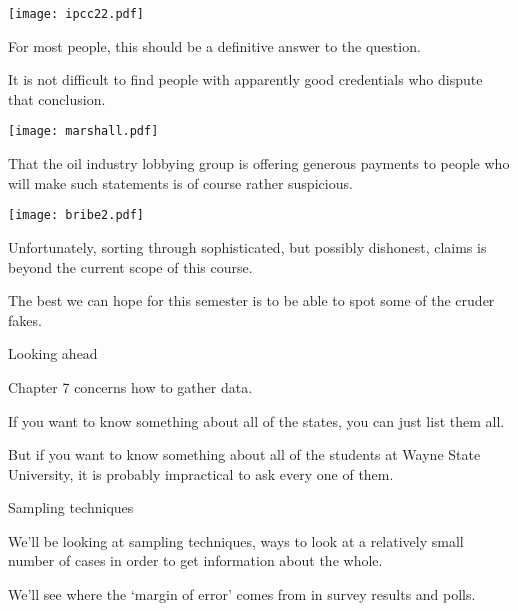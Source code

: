 \documentclass{beamer}
\begin{document}
\begin{frame}
\texttt{[image: ipcc22.pdf]}
\end{frame}

\begin{frame}
For most people, this should be a definitive answer to the
question.

\vfill
It is not difficult to find people with apparently good credentials
who dispute that conclusion.
\end{frame}

\begin{frame}
\texttt{[image: marshall.pdf]}
\end{frame}


\begin{frame}
That the oil industry lobbying group
is offering generous payments to people who will
make such statements is of course rather suspicious.  
\end{frame}

\begin{frame}
\texttt{[image: bribe2.pdf]}
\end{frame}

\begin{frame}
Unfortunately, sorting through sophisticated, but possibly
dishonest, claims is beyond the current scope of this course.

\vfill
The best we can hope for this semester is to be able to spot some
of the cruder fakes.
\end{frame}

\begin{frame}{Looking ahead}

Chapter 7 concerns how to gather data.

\vfill
If you want to know something about all of the
states, you can just list them all.

\vfill
But if you want to know something about all of
the students at Wayne State University, it is 
probably impractical to ask every one of them.
\end{frame}

\begin{frame}{Sampling techniques}

We'll be looking at sampling techniques, ways
to look at a relatively small number of cases in
order to get information about the whole.

\vfill
We'll see where the `margin of error' comes from
in survey results and polls.
\end{frame}
\end{document}
